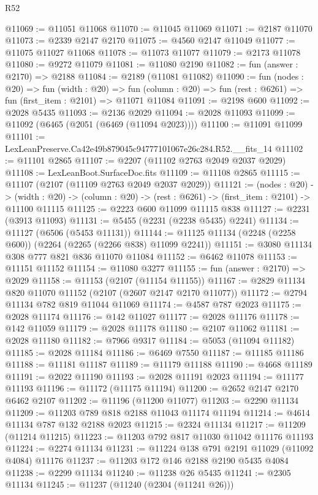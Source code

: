 \begin{lexlean}{R52}
\begin{coremodule}
@11069 := @11051 @11068
@11070 := @11045 @11069
@11071 := @2187 @11070
@11073 := @2339 @2147 @2170
@11075 := @4560 @2147 @11049
@11077 := @11075 @11027 @11068
@11078 := @11073 @11077
@11079 := @2173 @11078
@11080 := @9272 @11079
@11081 := @11080 @2190
@11082 := fun (answer : @2170) => @2188
@11084 := @2189 (@11081 @11082)
@11090 := fun (nodes : @20) =>
  fun (width : @20) =>
  fun (column : @20) => fun (rest : @6261) => fun (first_item : @2101) => @11071 @11084
@11091 := @2198 @600
@11092 := @2028 @5435
@11093 := @2136 @2029
@11094 := @2028 @11093
@11099 := @11092 (@6465 (@2051 (@6469 (@11094 @2023))))
@11100 := @11091 @11099
@11101 := LexLeanPreserve.Ca42e49b879045c94777101067e26c284.R52.__fits_14
@11102 := @11101 @2865
@11107 := @2207 (@11102 @2763 @2049 @2037 @2029)
@11108 := LexLeanBoot.SurfaceDoc.fits
@11109 := @11108 @2865
@11115 := @11107 (@2107 (@11109 @2763 @2049 @2037 @2029))
@11121 := (nodes : @20) ->
  (width : @20) -> (column : @20) -> (rest : @6261) -> (first_item : @2101) -> @11100 @11115
@11125 := @2223 @600 @11099 @11115 @838
@11127 := @2231 (@3913 @11093)
@11131 := @5455 (@2231 (@2238 @5435) @2241)
@11134 := @11127 (@6506 (@5453 @11131))
@11144 := @11125 @11134 (@2248 (@2258 @600)) (@2264 (@2265 (@2266 @838) @11099 @2241))
@11151 := @3080 @11134 @308 @777 @821 @836 @11070 @11084
@11152 := @6462 @11078
@11153 := @11151 @11152
@11154 := @11080 @3277
@11155 := fun (answer : @2170) => @2029
@11158 := @11153 (@2107 (@11154 @11155))
@11167 := @2829 @11134 @820 @11070 @11152 (@2107 (@2607 @2147 @2170 @11077))
@11172 := @2794 @11134 @782 @819 @11044 @11069
@11174 := @4587 @787 @2023
@11175 := @2028 @11174
@11176 := @142 @11027
@11177 := @2028 @11176
@11178 := @142 @11059
@11179 := @2028 @11178
@11180 := @2107 @11062
@11181 := @2028 @11180
@11182 := @7966 @9317
@11184 := @5053 (@11094 @11182)
@11185 := @2028 @11184
@11186 := @6469 @7550
@11187 := @11185 @11186
@11188 := @11181 @11187
@11189 := @11179 @11188
@11190 := @4668 @11189
@11191 := @2022 @11190
@11193 := @2028 @11191 @2023
@11194 := @11177 @11193
@11196 := @11172 (@11175 @11194)
@11200 := @2652 @2147 @2170 @6462 @2107
@11202 := @11196 (@11200 @11077)
@11203 := @2290 @11134
@11209 := @11203 @789 @818 @2188 @11043 @11174 @11194
@11214 := @4614 @11134 @787 @132 @2188 @2023
@11215 := @2324 @11134
@11217 := @11209 (@11214 @11215)
@11223 := @11203 @792 @817 @11030 @11042 @11176 @11193
@11224 := @2274 @11134
@11231 := @11224 @138 @791 @2191 @11029 (@11092 @4084) @11176
@11237 := @11203 @172 @146 @2188 @2190 @5435 @4084
@11238 := @2299 @11134
@11240 := @11238 @26 @5435
@11241 := @2305 @11134
@11245 := @11237 (@11240 (@2304 (@11241 @26)))

\end{coremodule}
\end{lexlean}

